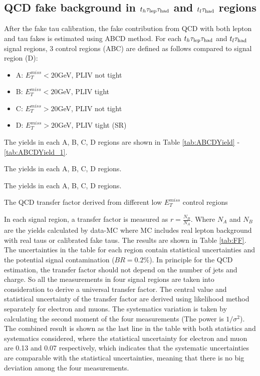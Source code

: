 \subsection{QCD fake background in $t_h\tau_\text{lep}{}\tau_\text{had}$ and $t_l\tau_\text{had}$ regions}
\label{sec:ABCD}
After the fake tau calibration, the fake contribution from QCD with both lepton and tau fakes is estimated using ABCD method. For each $t_h\tau_\text{lep}{}\tau_\text{had}$ and $t_l\tau_\text{had}$ signal regions, 3 control regions (ABC) are defined as follows compared to signal region (D):

\begin{itemize}
	\item A: $E_T^{miss}<20$GeV, PLIV not tight
	\item B: $E_T^{miss}<20$GeV, PLIV tight
	\item C: $E_T^{miss}>20$GeV, PLIV not tight
	\item D: $E_T^{miss}>20$GeV, PLIV tight (SR)
\end{itemize}

The yields in each A, B, C, D regions are shown in Table \ref{tab:ABCDYield} - \ref{tab:ABCDYield_1}.

\begin{table}
\caption{The yields in each A, B, C, D regions.}
\label{tab:ABCDYield}

\end{table}

\begin{table}
\caption{The yields in each A, B, C, D regions.}
\label{tab:ABCDYield_1}

\end{table}

\begin{table}
\caption{The QCD transfer factor derived from different low $E_T^{miss}$ control regions}
\label{tab:FF}

\end{table}

In each signal region, a transfer factor is measured as $r=\frac{N_B}{N_A}$. Where $N_A$ and $N_B$ are the yields calculated by data-MC where MC includes real lepton background with real taus or calibrated fake taus. The results are shown in Table \ref{tab:FF}. The uncertainties in the table for each region contain statistical uncertainties and the potential signal contamination ($BR=0.2\%$). In principle for the QCD estimation, the transfer factor should not depend on the number of jets and charge. So all the measurements in four signal regions are taken into consideration to derive a universal transfer factor. The central value and statistical uncertainty of the transfer factor are derived using likelihood method separately for electron and muons. The systematics variation is taken by calculating the second moment of the four measurements (The power is $1/\sigma^2$). The combined result is shown as the last line in the table with both statistics and systematics considered, where the statistical uncertainty for electron and muon are 0.13 and 0.07 respectively, which indicates that the systematic uncertainties are comparable with the statistical uncertainties, meaning that there is no big deviation among the four measurements.


